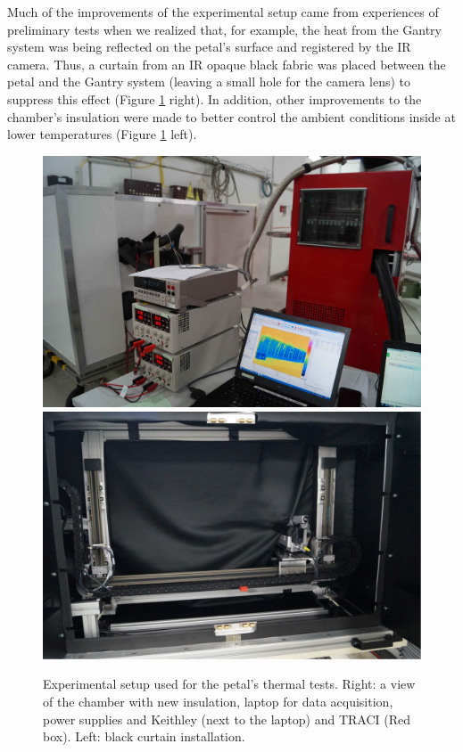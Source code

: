 		Much of the improvements of the experimental setup came from experiences of preliminary tests when we realized that, for example, the heat from the Gantry system was being reflected on the petal’s surface and registered by the IR camera. Thus, a curtain from an IR opaque black fabric was placed between the petal and the Gantry system (leaving a small hole for the camera lens) to suppress this effect (Figure \ref{fig2.7} right). In addition, other improvements to the chamber’s insulation were made to better control the ambient conditions inside at lower temperatures (Figure \ref{fig2.7} left). 
	
		\begin{figure}[ht!]
			\centering
			\captionsetup{justification=centering,margin=2cm}
			\includegraphics[scale=0.185]{Figures/Chapter02/ExperimentalSetup.jpg}
			\includegraphics[scale=0.22]{Figures/Chapter02/BlackCurtine.jpg}
			\caption{Experimental setup used for the petal’s thermal tests. Right: a view of the chamber with new insulation, laptop for data acquisition, power supplies and Keithley (next to the laptop) and TRACI (Red box). Left: black curtain installation.}\label{fig2.7}
		\end{figure}
	
